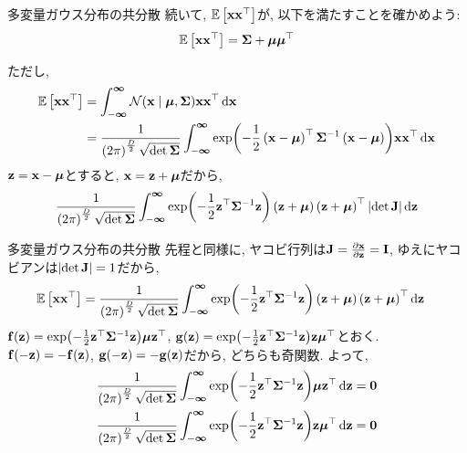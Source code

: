 \documentclass[dvipdfmx,notheorems,t]{beamer}
\begin{document}
\begin{frame}{多変量ガウス分布の共分散}
続いて, $\operatorname{\mathbb{E}} \left[ \vb{x} \vb{x}^\top \right]$が, 以下を満たすことを確かめよう:
\begin{align*}
  \operatorname{\mathbb{E}} \left[ \vb{x} \vb{x}^\top \right] = \vb{\Sigma} + \vb*{\mu} \vb*{\mu}^\top
\end{align*}

ただし,
\begin{align*}
  \operatorname{\mathbb{E}} \left[ \vb{x} \vb{x}^\top \right]
  &= \int_{-\boldsymbol{\infty}}^{\boldsymbol{\infty}}
    \mathcal{N}(\vb{x} \mid \vb*{\mu}, \vb{\Sigma})
    \vb{x} \vb{x}^\top \dd{\vb{x}} \\
  &= \frac{1}{\left( 2\pi \right)^\frac{D}{2} \sqrt{\det \vb{\Sigma}}}
    \int_{-\boldsymbol{\infty}}^{\boldsymbol{\infty}}
    \exp(-\frac{1}{2} \left( \vb{x} - \vb*{\mu} \right)^\top \vb{\Sigma}^{-1}
      \left( \vb{x} - \vb*{\mu} \right)) \vb{x} \vb{x}^\top \dd{\vb{x}}
\end{align*}
$\vb{z} = \vb{x} - \vb*{\mu}$とすると, $\vb{x} = \vb{z} + \vb*{\mu}$だから,
\begin{align*}
  \frac{1}{\left( 2\pi \right)^\frac{D}{2} \sqrt{\det \vb{\Sigma}}}
    \int_{-\boldsymbol{\infty}}^{\boldsymbol{\infty}}
    \exp(-\frac{1}{2} \vb{z}^\top \vb{\Sigma}^{-1} \vb{z})
    \left( \vb{z} + \vb*{\mu} \right) \left( \vb{z} + \vb*{\mu} \right)^\top
    \left| \det \vb{J} \right| \dd{\vb{z}}
\end{align*}
\end{frame}

\begin{frame}{多変量ガウス分布の共分散}
先程と同様に, ヤコビ行列は$\vb{J} = \pdv{\vb{x}}{\vb{z}} = \vb{I}$,
ゆえにヤコビアンは$\left| \det \vb{J} \right| = 1$だから,
\begin{align*}
  \operatorname{\mathbb{E}} \left[ \vb{x} \vb{x}^\top \right] &=
    \frac{1}{\left( 2\pi \right)^\frac{D}{2} \sqrt{\det \vb{\Sigma}}}
    \int_{-\boldsymbol{\infty}}^{\boldsymbol{\infty}}
    \exp(-\frac{1}{2} \vb{z}^\top \vb{\Sigma}^{-1} \vb{z})
    \left( \vb{z} + \vb*{\mu} \right) \left( \vb{z} + \vb*{\mu} \right)^\top \dd{\vb{z}}
\end{align*}
$\vb{f}(\vb{z}) = \exp(-\frac{1}{2} \vb{z}^\top \vb{\Sigma}^{-1} \vb{z}) \vb*{\mu} \vb{z}^\top$,
$\vb{g}(\vb{z}) = \exp(-\frac{1}{2} \vb{z}^\top \vb{\Sigma}^{-1} \vb{z}) \vb{z} \vb*{\mu}^\top$とおく. \\
$\vb{f}(-\vb{z}) = -\vb{f}(\vb{z})$, $\vb{g}(-\vb{z}) = -\vb{g}(\vb{z})$だから, どちらも奇関数.
よって,
\begin{align*}
  \frac{1}{\left( 2\pi \right)^\frac{D}{2} \sqrt{\det \vb{\Sigma}}}
  \int_{-\boldsymbol{\infty}}^{\boldsymbol{\infty}}
    \exp(-\frac{1}{2} \vb{z}^\top \vb{\Sigma}^{-1} \vb{z}) \vb*{\mu} \vb{z}^\top \dd{\vb{z}} &= \vb{0} \\
  \frac{1}{\left( 2\pi \right)^\frac{D}{2} \sqrt{\det \vb{\Sigma}}}
  \int_{-\boldsymbol{\infty}}^{\boldsymbol{\infty}}
    \exp(-\frac{1}{2} \vb{z}^\top \vb{\Sigma}^{-1} \vb{z}) \vb{z} \vb*{\mu}^\top \dd{\vb{z}} &= \vb{0}
\end{align*}
\end{frame}
\end{document}
